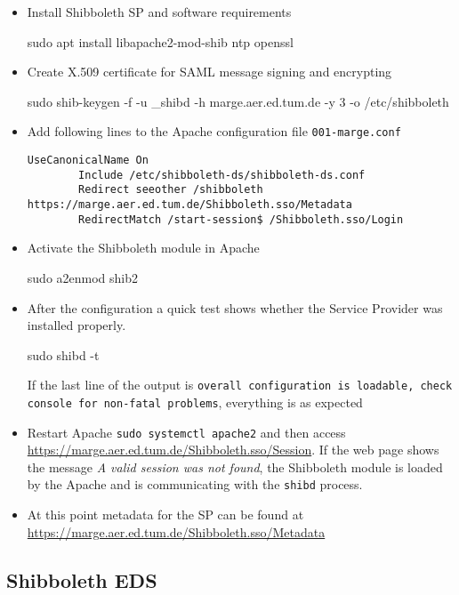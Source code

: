 \begin{itemize}
    \item Install Shibboleth SP and software requirements
    \begin{terminal}
        sudo apt install libapache2-mod-shib ntp openssl
    \end{terminal}
    \item Create X.509 certificate for SAML message signing and encrypting
    \begin{terminal}
        sudo shib-keygen -f -u _shibd -h marge.aer.ed.tum.de -y 3 -o /etc/shibboleth
    \end{terminal}
    \item Add following lines to the Apache configuration file
    \texttt{001-marge.conf}
    \begin{lstlisting}[frame={l}]
        UseCanonicalName On
        Include /etc/shibboleth-ds/shibboleth-ds.conf
        Redirect seeother /shibboleth https://marge.aer.ed.tum.de/Shibboleth.sso/Metadata
        RedirectMatch /start-session$ /Shibboleth.sso/Login
    \end{lstlisting}
    \item Activate the Shibboleth module in Apache
    \begin{terminal}
        sudo a2enmod shib2
    \end{terminal}
    \item After the configuration a quick test shows whether the Service
    Provider was installed properly.
    \begin{terminal}
        sudo shibd -t
    \end{terminal}
    If the last line of the output is \texttt{overall configuration is loadable,
    check console for non-fatal problems}, everything is as expected
    \item Restart Apache \texttt{sudo systemctl apache2} and then access
    \url{https://marge.aer.ed.tum.de/Shibboleth.sso/Session}. If the web page
    shows the message \textit{A valid session was not found}, the Shibboleth
    module is loaded by the Apache and is communicating with the \texttt{shibd}
    process.
    \item At this point metadata for the SP can be found at
    \url{https://marge.aer.ed.tum.de/Shibboleth.sso/Metadata}
\end{itemize}

\subsection{Shibboleth EDS}

